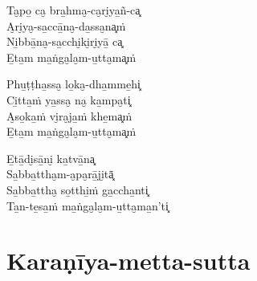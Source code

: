\begin{paritta}
Ta̮po̱ ca̮ bra̱hma̮-ca̮ri̮ya̱ñ-ca͓\\
A̮ri̮ya̮-sa̱ccā̱na̮-da̱ssa̮na͓ṁ\\
Ni̱bbā̱na̮-sa̱cchi̮ki̮ri̮yā̱ ca͓\\
E̱ta̱m ma̱ṅga̮la̮m-u̱tta̮ma͓ṁ

Phu̱ṭṭha̱ssa̮ lo̱ka̮-dha̱mme̱hi͓\\
Ci̱tta̱ṁ ya̱ssa̮ na̮ ka̱mpa̮ti͓\\
A̮so̱ka̱ṁ vi̮ra̮ja̱ṁ khe̱ma͓ṁ\\
E̱ta̱m ma̱ṅga̮la̮m-u̱tta̮ma͓ṁ

E̱tā̱di̮sā̱ni̮ ka̱tvā̱na͓\\
Sa̱bba̱ttha̮m-a̮pa̮rā̱ji̮tā͓\\
Sa̱bba̱ttha̮ so̱tthi̱ṁ ga̱ccha̱nti͓\\
Ta̱n-te̱sa̱ṁ ma̱ṅga̮la̮m-u̱tta̮ma̱n'ti͓


\end{paritta}

\clearpage

\chapter{Karaṇīya-metta-sutta}


